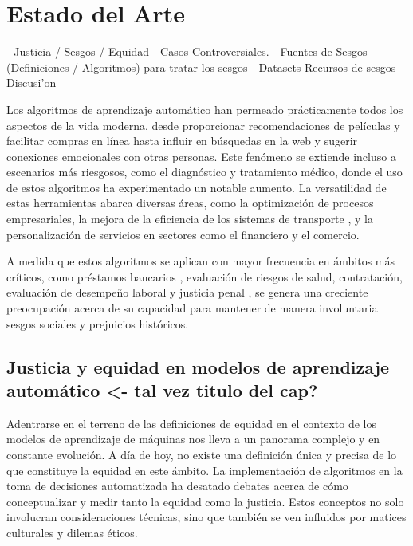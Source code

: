 \chapter{Estado del Arte}\label{chapter:state-of-the-art}

- Justicia / Sesgos / Equidad
- Casos Controversiales.
- Fuentes de Sesgos
- (Definiciones / Algoritmos) para tratar los sesgos
- Datasets Recursos de sesgos
- Discusi'on

Los algoritmos de aprendizaje autom\'atico han permeado pr\'acticamente todos los aspectos de la vida moderna,
desde proporcionar recomendaciones de pel\'iculas y facilitar compras en l\'inea hasta influir en b\'usquedas en la web
y sugerir conexiones emocionales con otras personas. Este fen\'omeno se extiende incluso a escenarios m\'as riesgosos,
como el diagn\'ostico y tratamiento m\'edico, donde el uso de estos algoritmos ha experimentado un notable aumento.
La versatilidad de estas herramientas abarca diversas \'areas, como la optimizaci\'on de procesos empresariales, la 
mejora de la eficiencia de los sistemas de transporte \cite{autonomous_driving}, y la personalizaci\'on de servicios en 
sectores como el financiero y el comercio.

A medida que estos algoritmos se aplican con mayor frecuencia en \'ambitos m\'as cr\'iticos, como
pr\'estamos bancarios \cite{fairness_def}, evaluaci\'on de riesgos de salud, contrataci\'on, evaluaci\'on de desempe\~no laboral y
justicia penal \cite{compas}, se genera una creciente preocupaci\'on acerca de su capacidad para mantener de manera involuntaria 
sesgos sociales y prejuicios hist\'oricos. 

\section{Justicia y equidad en modelos de aprendizaje autom\'atico <- tal vez titulo del cap?}

Adentrarse en el terreno de las definiciones de equidad en el contexto de los modelos de aprendizaje de m\'aquinas nos lleva 
a un panorama complejo y en constante evoluci\'on. A d\'ia de hoy, no existe una definici\'on \'unica y precisa
de lo que constituye la equidad en este \'ambito. La implementaci\'on de algoritmos en la toma de decisiones automatizada ha desatado 
debates acerca de c\'omo conceptualizar y medir tanto la equidad como la justicia. Estos conceptos no solo involucran consideraciones 
t\'ecnicas, sino que tambi\'en se ven influidos por matices culturales y dilemas \'eticos.

